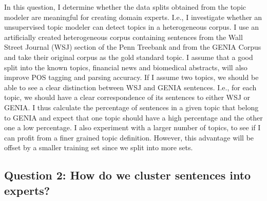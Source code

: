 In this question, I determine whether the data splits obtained from the topic modeler are meaningful for creating domain experts. I.e., I investigate whether an unsupervised topic modeler can detect topics in a heterogeneous corpus. I use an artificially created heterogeneous corpus containing sentences from the Wall Street Journal (WSJ) section of the Penn Treebank \citep{marcus:kim:ea:94} and  from the GENIA Corpus \citep{tateisi:tsujii:04} and take their original corpus as the gold standard topic. I assume that a good split into the known topics, financial news and biomedical abstracts, will also improve POS tagging and parsing accuracy. 
If I assume two topics, we should be able to see a clear distinction between WSJ and GENIA sentences. I.e., for each topic, we should have a clear correspondence of its sentences to either WSJ or GENIA. I thus calculate the percentage of sentences in a given topic that belong to GENIA and expect that one topic should have a high percentage and the other one a low percentage. I also experiment with a larger number of topics, to see if I can profit from a finer grained topic definition. However, this advantage will be offset by a smaller training set since we split into more sets. 



\subsection*{Question 2: How do we cluster sentences into experts?}

